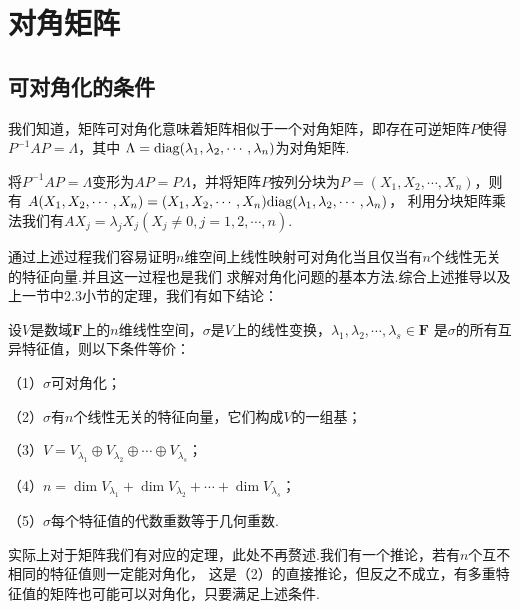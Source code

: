 \section{对角矩阵}
\subsection{可对角化的条件}
我们知道，矩阵可对角化意味着矩阵相似于一个对角矩阵，即存在可逆矩阵$P$使得$P^{-1}AP=\Lambda$，其中
$\Lambda=\textup{diag}(\lambda_1,\lambda_2,\cdots,\lambda_n)$为对角矩阵.

将$P^{-1}AP=\Lambda$变形为$AP=P\Lambda$，并将矩阵$P$按列分块为$P=(X_1,X_2,\cdots,X_n)$，则有
$A(X_1,X_2,\cdots,X_n)=(X_1,X_2,\cdots,X_n)\textup{diag}(\lambda_1,\lambda_2,\cdots,\lambda_n)$，
利用分块矩阵乘法我们有$AX_j=\lambda_jX_j(X_j\neq 0,j=1,2,\cdots,n)$.

通过上述过程我们容易证明$n$维空间上线性映射可对角化当且仅当有$n$个线性无关的特征向量.并且这一过程也是我们
求解对角化问题的基本方法.综合上述推导以及上一节中2.3小节的定理，我们有如下结论：
\begin{theorem}
	设$V$是数域$\mathbf{F}$上的$n$维线性空间，$\sigma$是$V$上的线性变换，$\lambda_1,\lambda_2,\cdots,\lambda_s\in\mathbf{F}$
	是$\sigma$的所有互异特征值，则以下条件等价：
	
	\textup{（1）}$\sigma$可对角化\textup{；}
	
	\textup{（2）}$\sigma$有$n$个线性无关的特征向量，它们构成$V$的一组基\textup{；}
	
	\textup{（3）}$V=V_{\lambda_1}\oplus V_{\lambda_2}\oplus\cdots\oplus V_{\lambda_s}$\textup{；}
	
	\textup{（4）}$n=\dim V_{\lambda_1}+\dim V_{\lambda_2}+\cdots+\dim V_{\lambda_s}$\textup{；}
	
	\textup{（5）}$\sigma$每个特征值的代数重数等于几何重数\textup{.}
\end{theorem}
实际上对于矩阵我们有对应的定理，此处不再赘述.我们有一个推论，若有$n$个互不相同的特征值则一定能对角化，
这是（2）的直接推论，但反之不成立，有多重特征值的矩阵也可能可以对角化，只要满足上述条件.

